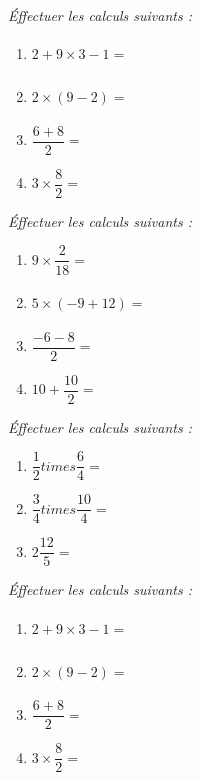 \documentclass[13pt]{article}
\begin{document}

\setlength{\columnseprule}{1pt}

\begin{multicols}{2}

  \textit{Éffectuer les calculs suivants :}

  \begin{enumerate}
  \item $2 + 9 \times 3 - 1 = \phantom{\dfrac{1}{1}}$ 
  \item $2 \times (9 - 2) = \phantom{\dfrac{1}{1}} $
  \item $\dfrac{6 + 8}{2} = $
  \item $3 \times \dfrac{8}{2} = $
  \end{enumerate}

  \textit{Éffectuer les calculs suivants :}

  \begin{enumerate}
  \item $9 \times \dfrac{2}{18} = $ 
  \item $5 \times (-9 + 12) = \phantom{\dfrac{1}{1}}$
  \item $\dfrac{-6 - 8}{2} = $
  \item $10 + \dfrac{10}{2} = $
  \end{enumerate}

\end{multicols}

\vspace{0.3cm}
\noindent\hrulefill
\vspace{0.3cm}

\begin{multicols}{2}

  \textit{Éffectuer les calculs suivants :}

  \begin{enumerate}
  \item $\dfrac{1}{2} times \dfrac{6}{4} = \phantom{\dfrac{1}{1}}$ 
  \item $\dfrac{3}{4} times \dfrac{10}{4} = \phantom{\dfrac{1}{1}}$ 
  \item $2 \dfrac{12}{5} = \phantom{\dfrac{1}{1}}$ 
  \end{enumerate}

  \textit{Éffectuer les calculs suivants :}

  \begin{enumerate}
  \item $2 + 9 \times 3 - 1 = \phantom{\dfrac{1}{1}}$ 
  \item $2 \times (9 - 2) = \phantom{\dfrac{1}{1}}$
  \item $\dfrac{6 + 8}{2} = $
  \item $3 \times \dfrac{8}{2} = $
  \end{enumerate}

\end{multicols}
\end{document}
